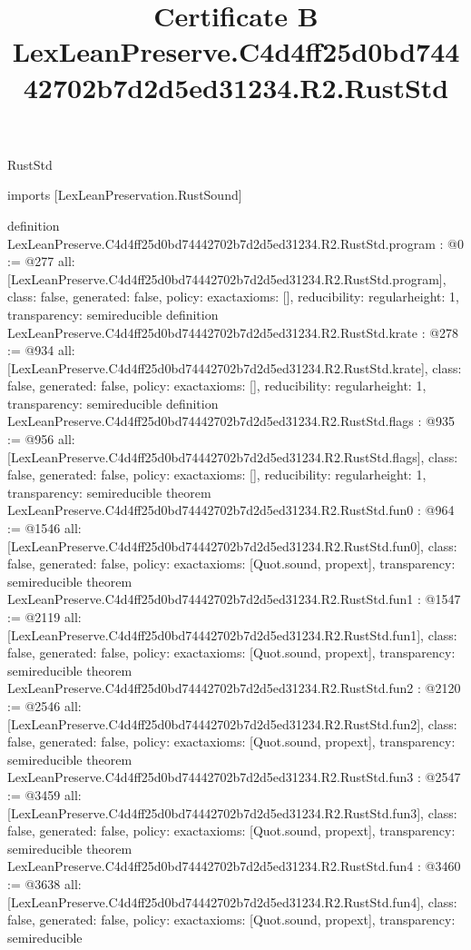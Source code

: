 \begin{lexlean}{RustStd}
\title{Certificate B LexLeanPreserve.C4d4ff25d0bd74442702b7d2d5ed31234.R2.RustStd}
\begin{coremodule}
imports [LexLeanPreservation.RustSound]

definition LexLeanPreserve.C4d4ff25d0bd74442702b7d2d5ed31234.R2.RustStd.program : @0 := @277 {
  all: [LexLeanPreserve.C4d4ff25d0bd74442702b7d2d5ed31234.R2.RustStd.program],
  class: false,
  generated: false,
  policy: exact{axioms: []},
  reducibility: regular{height: 1},
  transparency: semireducible
}
definition LexLeanPreserve.C4d4ff25d0bd74442702b7d2d5ed31234.R2.RustStd.krate : @278 := @934 {
  all: [LexLeanPreserve.C4d4ff25d0bd74442702b7d2d5ed31234.R2.RustStd.krate],
  class: false,
  generated: false,
  policy: exact{axioms: []},
  reducibility: regular{height: 1},
  transparency: semireducible
}
definition LexLeanPreserve.C4d4ff25d0bd74442702b7d2d5ed31234.R2.RustStd.flags : @935 := @956 {
  all: [LexLeanPreserve.C4d4ff25d0bd74442702b7d2d5ed31234.R2.RustStd.flags],
  class: false,
  generated: false,
  policy: exact{axioms: []},
  reducibility: regular{height: 1},
  transparency: semireducible
}
theorem LexLeanPreserve.C4d4ff25d0bd74442702b7d2d5ed31234.R2.RustStd.fun0 : @964 := @1546 {
  all: [LexLeanPreserve.C4d4ff25d0bd74442702b7d2d5ed31234.R2.RustStd.fun0],
  class: false,
  generated: false,
  policy: exact{axioms: [Quot.sound, propext]},
  transparency: semireducible
}
theorem LexLeanPreserve.C4d4ff25d0bd74442702b7d2d5ed31234.R2.RustStd.fun1 : @1547 := @2119 {
  all: [LexLeanPreserve.C4d4ff25d0bd74442702b7d2d5ed31234.R2.RustStd.fun1],
  class: false,
  generated: false,
  policy: exact{axioms: [Quot.sound, propext]},
  transparency: semireducible
}
theorem LexLeanPreserve.C4d4ff25d0bd74442702b7d2d5ed31234.R2.RustStd.fun2 : @2120 := @2546 {
  all: [LexLeanPreserve.C4d4ff25d0bd74442702b7d2d5ed31234.R2.RustStd.fun2],
  class: false,
  generated: false,
  policy: exact{axioms: [Quot.sound, propext]},
  transparency: semireducible
}
theorem LexLeanPreserve.C4d4ff25d0bd74442702b7d2d5ed31234.R2.RustStd.fun3 : @2547 := @3459 {
  all: [LexLeanPreserve.C4d4ff25d0bd74442702b7d2d5ed31234.R2.RustStd.fun3],
  class: false,
  generated: false,
  policy: exact{axioms: [Quot.sound, propext]},
  transparency: semireducible
}
theorem LexLeanPreserve.C4d4ff25d0bd74442702b7d2d5ed31234.R2.RustStd.fun4 : @3460 := @3638 {
  all: [LexLeanPreserve.C4d4ff25d0bd74442702b7d2d5ed31234.R2.RustStd.fun4],
  class: false,
  generated: false,
  policy: exact{axioms: [Quot.sound, propext]},
  transparency: semireducible
}
\end{coremodule}
\end{lexlean}
